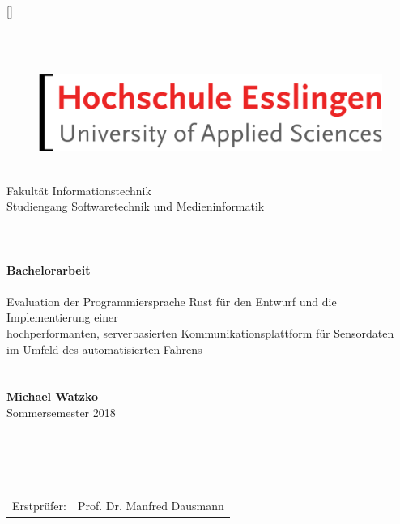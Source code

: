 

\newcommand{\setitle}{Bachelorarbeit}
\newcommand{\seauthor}{Michael Watzko}
\newcommand{\figurewidth}{0.66\textwidth}

\clearscrheadings
\clearscrplain

\pagestyle{scrheadings}	

\ihead[]{\leftmark}
\ohead[]{\rightmark}

\ifoot[]{}
\ofoot[\pagemark]{\pagemark}
\setheadsepline{.4pt}[\color{black}]

\begin{titlepage}
	\centering
	~\\ ~\\ 
	\begin{figure}[H]
		\centering
		\includegraphics[width=.5\textwidth]{images/hs_logo.png}
	\end{figure}
	~\\
	Fakultät Informationstechnik \\
	Studiengang Softwaretechnik und Medieninformatik
	 ~\\ ~\\ ~\\ ~\\
	\LARGE{
		\textbf{\setitle} ~\\ ~\\
		Evaluation der Programmiersprache Rust für den
		Entwurf und die Implementierung einer\\hochperformanten,
		serverbasierten Kommunikationsplattform für Sensordaten\\
		im Umfeld des automatisierten Fahrens
	}
	~\\ ~\\ ~\\
	\normalsize \textbf{Michael Watzko} \\
	Sommersemester 2018
	 ~\\ ~\\ ~\\ ~\\ ~\\
	\begin{tabular}{rl}
		Erstprüfer: & Prof. Dr. Manfred Dausmann\\

\end{tabular}
\end{titlepage}
